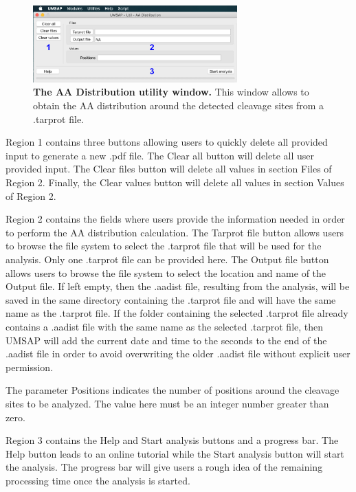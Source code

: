 \begin{figure}[h]
	\centering
	\includegraphics[width=0.7\textwidth]{./IMAGES/UTIL-AA-WINDOW/util-aa.jpg}	    
	\caption[The AA Distribution utility window]{\textbf{The AA Distribution utility window.} This window allows to obtain the AA distribution around the detected cleavage sites from a .tarprot file.} 
	\label{fig:utilAadistCalc}
	\vspace{-5pt} 	
\end{figure}

Region \num{1} contains three buttons allowing users to quickly delete all provided input to generate a new .pdf file. The Clear all button will delete all user provided input. The Clear files button will delete all values in section Files of Region \num{2}. Finally, the Clear values button will delete all values in section Values of Region \num{2}.

Region \num{2} contains the fields where users provide the information needed in order to perform the AA distribution calculation. The Tarprot file button allows users to browse the file system to select the .tarprot file that will be used for the analysis. Only one .tarprot file can be provided here. The Output file button allows users to browse the file system to select the location and name of the Output file. If left empty, then the .aadist file, resulting from the analysis, will be saved in the same directory containing the .tarprot file and will have the same name as the .tarprot file. If the folder containing the selected .tarprot file already contains a .aadist file with the same name as the selected .tarprot file, then UMSAP will add the current date and time to the seconds to the end of the .aadist file in order to avoid overwriting the older .aadist file without explicit user permission.    

The parameter Positions indicates the number of positions around the cleavage sites to be analyzed. The value here must be an integer number greater than zero.

Region \num{3} contains the Help and Start analysis buttons and a progress bar. The Help button leads to an online tutorial while the Start analysis button will start the analysis. The progress bar will give users a rough idea of the remaining processing time once the analysis is started.

